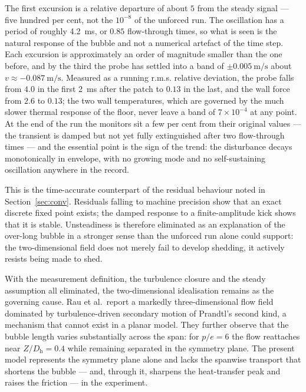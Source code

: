 \documentclass[11pt,a4paper]{article}
\newcommand{\Dh}{D_{\mathrm{h}}}
\begin{document}
The first excursion is a relative departure of about $5$ from the steady
signal --- five hundred per cent, not the $10^{-8}$ of the unforced run.
The oscillation has a period of roughly \SI{4.2}{\milli\second}, or $0.85$
flow-through times, so what is seen is the natural response of the bubble
and not a numerical artefact of the time step. Each excursion is
approximately an order of magnitude smaller than the one before, and by the
third the probe has settled into a band of
$\pm\SI{0.005}{\meter\per\second}$ about
$v \approx \SI{-0.087}{\meter\per\second}$. Measured as a running r.m.s.
relative deviation, the probe falls from $4.0$ in the first
\SI{2}{\milli\second} after the patch to $0.13$ in the last, and the wall
force from $2.6$ to $0.13$; the two wall temperatures, which are governed by
the much slower thermal response of the floor, never leave a band of
$7 \times 10^{-4}$ at any point. At the end of the run the monitors sit a
few per cent from their original values --- the transient is damped but not
yet fully extinguished after two flow-through times --- and the essential
point is the sign of the trend: the disturbance decays monotonically in
envelope, with no growing mode and no self-sustaining oscillation anywhere
in the record.

This is the time-accurate counterpart of the residual behaviour noted in
Section~\ref{sec:conv}. Residuals falling to machine precision show that an
exact discrete fixed point exists; the damped response to a finite-amplitude
kick shows that it is stable. Unsteadiness is therefore eliminated as an
explanation of the over-long bubble in a stronger sense than the unforced
run alone could support: the two-dimensional field does not merely fail to
develop shedding, it actively resists being made to shed.

With the measurement definition, the turbulence closure and the steady
assumption all eliminated, the two-dimensional idealisation remains as the
governing cause. Rau et al.\ report a markedly three-dimensional flow field
dominated by turbulence-driven secondary motion of Prandtl's second kind, a
mechanism that cannot exist in a planar model. They further observe that the
bubble length varies substantially across the span: for $p/e = 6$ the flow
reattaches near $Z/\Dh = 0.4$ while remaining separated in the symmetry
plane. The present model represents the symmetry plane alone and lacks the
spanwise transport that shortens the bubble --- and, through it, sharpens
the heat-transfer peak and raises the friction --- in the experiment.
\end{document}
